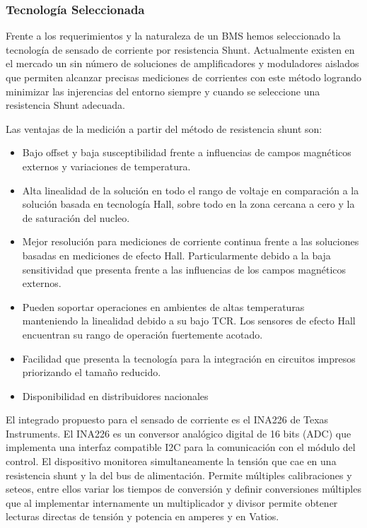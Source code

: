 \documentclass[10pt,a4paper]{article}
\begin{document}
	\subsubsection{Tecnología Seleccionada}
	
	Frente a los requerimientos y la naturaleza de un BMS hemos seleccionado la tecnología de sensado de corriente por resistencia Shunt. Actualmente existen en el mercado un sin número de soluciones de amplificadores y moduladores aislados que permiten alcanzar precisas mediciones de corrientes con este método logrando minimizar las injerencias del entorno siempre y cuando se seleccione una resistencia Shunt adecuada.
	
	Las ventajas de la medición a partir del método de resistencia shunt son:
	
	\begin{itemize}
		\item Bajo offset y baja susceptibilidad frente a influencias de campos magnéticos externos y variaciones de temperatura.
		\item Alta linealidad de la solución en todo el rango de voltaje en comparación a la solución basada en tecnología Hall, sobre todo en la zona cercana a cero y la de saturación del nucleo. 
		\item Mejor resolución para mediciones de corriente continua frente a las soluciones basadas en mediciones de efecto Hall. Particularmente debido a la baja sensitividad que presenta frente a las influencias de los campos magnéticos externos.
		\item Pueden soportar operaciones en ambientes de altas temperaturas manteniendo la linealidad debido a su bajo TCR. Los sensores de efecto Hall encuentran su rango de operación fuertemente acotado.
		\item Facilidad que presenta la tecnología para la integración en circuitos impresos priorizando el tamaño reducido.
		\item Disponibilidad en distribuidores nacionales
	\end{itemize}
	
	El integrado propuesto para el sensado de corriente es el INA226 de Texas Instruments. El INA226 es un conversor analógico digital de 16 bits (ADC) que implementa una interfaz compatible I2C para la comunicación con el módulo del control. El dispositivo monitorea simultaneamente la tensión que cae en una resistencia shunt y la del bus de alimentación. Permite múltiples calibraciones y seteos, entre ellos variar los tiempos de conversión y definir conversiones múltiples que al implementar internamente un multiplicador y divisor permite obtener lecturas directas de tensión y potencia en amperes y en Vatios.
	
\end{document}
